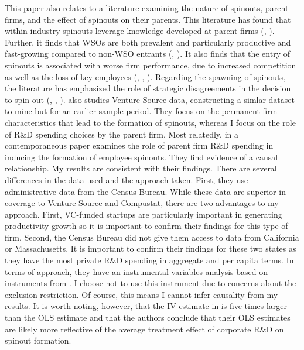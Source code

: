 \documentclass[11pt,english]{article}
\theoremstyle{definition}
\begin{document}
This paper also relates to a literature examining the nature of spinouts, parent firms, and the effect of spinouts on their parents. This literature has found that within-industry spinouts leverage knowledge developed at parent firms (\cite{klepper_capabilities_2002}, \cite{agarwal_knowledge_2002}). Further, it finds that WSOs are both prevalent and particularly productive and fast-growing compared to non-WSO entrants (\cite{muendler_employee_2012}, \cite{baslandze_spinout_2019}). It also finds that the entry of spinouts is associated with worse firm performance, due to increased competition as well as the loss of key employees (\cite{wezel_competitive_2006}, \cite{campbell_who_2012}, \cite{agarwal_what_2013}). Regarding the spawning of spinouts, the literature has emphasized the role of strategic disagreements in the decision to spin out (\cite{klepper_entry_2005}, \cite{klepper_disagreements_2007}, \cite{klepper_disagreements_2010}). \cite{gompers_entrepreneurial_2005} also studies Venture Source data, constructing a simlar dataset to mine but for an earlier sample period. They focus on the permanent firm-characteristics that lead to the formation of spinouts, whereas I focus on the role of R\&D spending choices by the parent firm. Most relatedly, in a contemporaneous paper \cite{babina_entrepreneurial_2019} examines the role of parent firm R\&D spending in inducing the formation of employee spinouts. They find evidence of a causal relationship. My results are consistent with their findings. There are several differences in the data used and the approach taken. First, they use administrative data from the Census Bureau. While these data are superior in coverage to Venture Source and Compustat, there are two advantages to my approach. First, VC-funded startups are particularly important in generating productivity growth so it is important to confirm their findings for this type of firm. Second, the Census Bureau did not give them access to data from California or Massachusetts. It is important to confirm their findings for these two states as they have the most private R\&D spending in aggregate and per capita terms. In terms of approach, they have an instrumental variables analysis based on instruments from \cite{bloom_identifying_2013}. I choose not to use this instrument due to concerns about the exclusion restriction. Of course, this means I cannot infer causality from my results. It is worth noting, however, that the IV estimate in \cite{babina_entrepreneurial_2019} is five times larger than the OLS estimate and that the authors conclude that their OLS estimates are likely more reflective of the average treatment effect of corporate R\&D on spinout formation.
\end{document}
